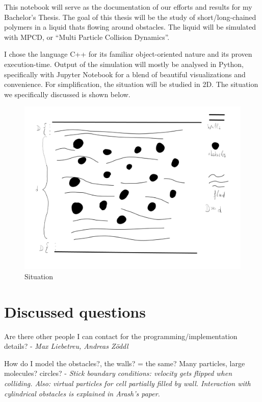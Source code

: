 \documentclass[
]{article}
\begin{document}
This notebook will serve as the documentation of our efforts and results
for my Bachelor's Thesis. The goal of this thesis will be the study of
short/long-chained polymers in a liquid thats flowing around obstacles.
The liquid will be simulated with MPCD, or ``Multi Particle Collision
Dynamics''.

I chose the language C++ for its familiar object-oriented nature and its
proven execution-time. Output of the simulation will mostly be analysed
in Python, specifically with Jupyter Notebook for a blend of beautiful
visualizations and convenience. For simplification, the situation will
be studied in 2D. The situation we specifically discussed is shown
below.

\begin{figure}
\centering
\includegraphics{Assets/MPCD_Situation.png}
\caption{Situation}
\end{figure}

\hypertarget{discussed-questions}{%
\section{Discussed questions}\label{discussed-questions}}

Are there other people I can contact for the programming/implementation
details? - \emph{Max Liebetreu, Andreas Zöddl}

How do I model the obstacles?, the walls? = the same? Many particles,
large molecules? circles? - \emph{Stick boundary conditions: velocity
gets flipped when colliding. Also: virtual particles for cell partially
filled by wall. Interaction with cylindrical obstacles is explained in
Arash's paper.}
\end{document}
